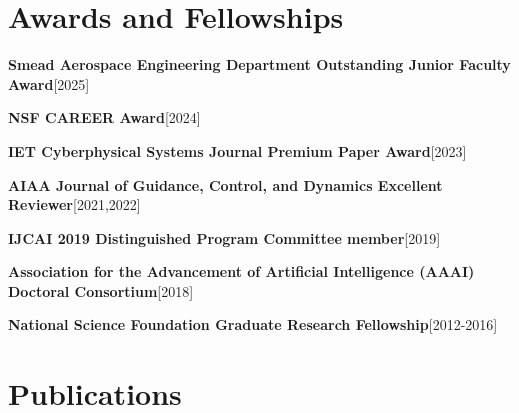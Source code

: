 \documentclass[10pt,roman]{moderncv}
\newcommand{\mycvitem}[2]{
    \textbf{#2}\hfill [#1]\break
}
\begin{document}
\section{Awards and Fellowships}

\mycvitem{2025}{Smead Aerospace Engineering Department Outstanding Junior Faculty Award}
\mycvitem{2024}{NSF CAREER Award}
\mycvitem{2023}{IET Cyberphysical Systems Journal Premium Paper Award}
\mycvitem{2021,2022}{AIAA Journal of Guidance, Control, and Dynamics Excellent Reviewer}
\mycvitem{2019}{IJCAI 2019 Distinguished Program Committee member}
\mycvitem{2018}{Association for the Advancement of Artificial Intelligence (AAAI) Doctoral Consortium}
\mycvitem{2012-2016}{National Science Foundation Graduate Research Fellowship}


% 

\clearpage
\section{Publications}
\end{document}
